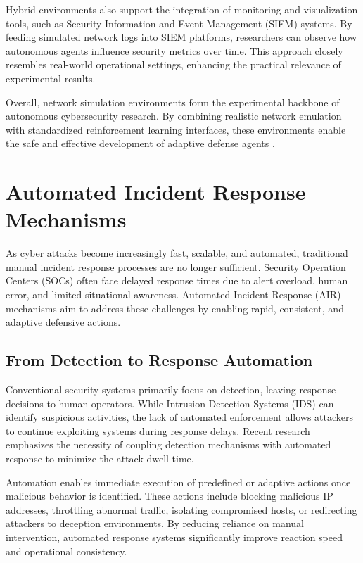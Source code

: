 \documentclass[12pt,a4paper]{report}
\begin{document}
Hybrid environments also support the integration of monitoring and visualization tools, such as Security Information and Event Management (SIEM) systems.
By feeding simulated network logs into SIEM platforms, researchers can observe how autonomous agents influence security metrics over time.
This approach closely resembles real-world operational settings, enhancing the practical relevance of experimental results.

Overall, network simulation environments form the experimental backbone of autonomous cybersecurity research.
By combining realistic network emulation with standardized reinforcement learning interfaces, these environments enable the safe and effective development of adaptive defense agents \cite{lantzMininet2010,gymnasium2023}.

\section{Automated Incident Response Mechanisms}

As cyber attacks become increasingly fast, scalable, and automated, traditional manual incident response processes are no longer sufficient.
Security Operation Centers (SOCs) often face delayed response times due to alert overload, human error, and limited situational awareness.
Automated Incident Response (AIR) mechanisms aim to address these challenges by enabling rapid, consistent, and adaptive defensive actions.

\subsection{From Detection to Response Automation}

Conventional security systems primarily focus on detection, leaving response decisions to human operators.
While Intrusion Detection Systems (IDS) can identify suspicious activities, the lack of automated enforcement allows attackers to continue exploiting systems during response delays.
Recent research emphasizes the necessity of coupling detection mechanisms with automated response to minimize the attack dwell time.

Automation enables immediate execution of predefined or adaptive actions once malicious behavior is identified.
These actions include blocking malicious IP addresses, throttling abnormal traffic, isolating compromised hosts, or redirecting attackers to deception environments.
By reducing reliance on manual intervention, automated response systems significantly improve reaction speed and operational consistency.
\end{document}
